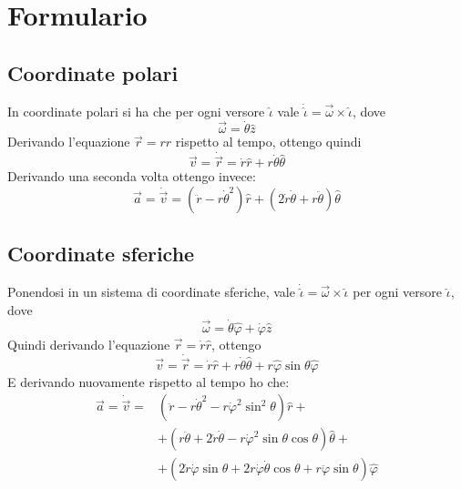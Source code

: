 \documentclass[../main.tex]{subfiles}
\begin{document}
\section{Formulario}
\setcounter{equation}{0}
\renewcommand{\theequation}{F.\arabic{equation}}
\subsection{Coordinate polari} 
In coordinate polari si ha che per ogni versore $\hat{\iota}$ vale $\dot{\hat{\iota}}=\vec{\omega}\times\hat{\iota}$,
dove
\begin{equation}\label{OmegaPolari}
	\vec{\omega}=\dot{\theta}\hat{z}
\end{equation}
Derivando l'equazione $\vec{r}=r\hat{r}$ rispetto al tempo, ottengo quindi
\begin{equation}\label{VelCooPolari}
	\vec{v}=\dot{\vec{r}}=\dot{r}\hat{r}+r\dot{\theta}\hat{\theta}
\end{equation}
Derivando una seconda volta ottengo invece:
\begin{equation}\label{AccCooPolari}
	\vec{a}=\dot{\vec{v}} =(\ddot{r}-r\dot{\theta}^2)\hat{r}+(2\dot{r}\dot{\theta}+r\ddot{\theta})\hat{\theta}
\end{equation}

\subsection{Coordinate sferiche}
Ponendosi in un sistema di coordinate sferiche, vale $\dot{\hat{\iota}}=\vec{\omega}\times\hat{\iota}$
per ogni versore $\hat{\iota}$, dove
\begin{equation}\label{OmegaSferiche}
	\vec{\omega}=\dot{\theta}\hat{\varphi}+\dot{\varphi}\hat{z}
\end{equation}
Quindi derivando l'equazione $\vec{r}=\dot{r}\hat{r}$, ottengo
\begin{equation}\label{VelCooSferiche}
	\vec{v} =\dot{\vec{r}}=\dot{r}\hat{r}+r\dot{\theta}\hat{\theta}+r\hat{\varphi}\sin{\theta}\hat{\varphi}
\end{equation}
E derivando nuovamente rispetto al tempo ho che:
\begin{equation}\label{AccCooSferiche}
\begin{split}
	\vec{a}=	\dot{\vec{v}}=	&\left(\ddot{r}-r\dot{\theta}^2-r\dot{\varphi}^2\sin^2\theta \right)\hat{r}+\\
													&	+\left( r\ddot{\theta}+2\dot{r}\dot{\theta}-r\dot{\varphi}^2\sin\theta\cos\theta \right)\hat{\theta}+\\
													&	+\left( 2\dot{r}\dot{\varphi}\sin\theta+2r\dot{\varphi}\dot{\theta}\cos\theta+r\ddot{\varphi}\sin\theta \right)\hat{\varphi}
\end{split}
\end{equation}
\end{document}
